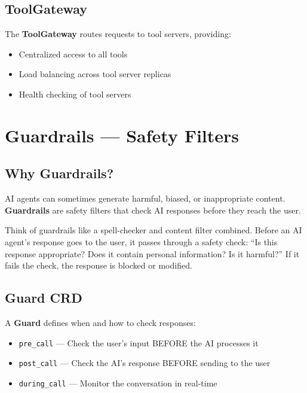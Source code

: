 \documentclass[12pt,a4paper,openany]{report}
\begin{document}
\section{ToolGateway}

The \textbf{ToolGateway} routes requests to tool servers, providing:
\begin{itemize}
    \item Centralized access to all tools
    \item Load balancing across tool server replicas
    \item Health checking of tool servers
\end{itemize}


\chapter{Guardrails — Safety Filters}

\section{Why Guardrails?}

AI agents can sometimes generate harmful, biased, or inappropriate content. \textbf{Guardrails} are safety filters that check AI responses before they reach the user.

\begin{analogybox}
Think of guardrails like a spell-checker and content filter combined. Before an AI agent's response goes to the user, it passes through a safety check: ``Is this response appropriate? Does it contain personal information? Is it harmful?'' If it fails the check, the response is blocked or modified.
\end{analogybox}

\section{Guard CRD}

A \textbf{Guard} defines when and how to check responses:

\begin{itemize}
    \item \texttt{pre\_call} — Check the user's input BEFORE the AI processes it
    \item \texttt{post\_call} — Check the AI's response BEFORE sending to the user
    \item \texttt{during\_call} — Monitor the conversation in real-time
\end{itemize}
\end{document}
